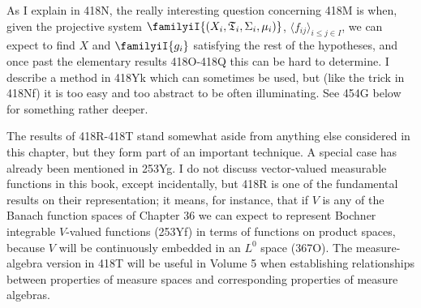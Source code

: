 {As I explain in 418N, the really interesting question concerning 418M is
when, given the projective system
$\familyiI{(X_i,\frak T_i,\Sigma_i,\mu_i)}$,
$\langle f_{ij}\rangle_{i\le j\in I}$, we can expect to find $X$ and
$\familyiI{g_i}$ satisfying the
rest of the hypotheses, and once past the elementary results 418O-418Q
this can be hard to determine.   I describe a method in 418Yk
which can sometimes be used, but (like the trick in 418Nf) it is too
easy and too abstract to be often illuminating.   See 454G below for
something rather deeper.

The results of 418R-418T stand somewhat aside from anything else
considered in this chapter, but they form part of an important
technique.   A special case has already been mentioned in 253Yg.   I do
not discuss vector-valued measurable functions in this book, except
incidentally, but 418R is one of the fundamental results on their
representation;  it means, for instance, that if $V$ is any of the
Banach function spaces of Chapter 36 we can expect to represent Bochner
integrable $V$-valued functions (253Yf) in terms of functions on product
spaces, because $V$ will be continuously embedded in an $L^0$ space
(367O).   The measure-algebra version in 418T will be useful in
Volume 5 when establishing relationships between properties of measure
spaces and corresponding properties of measure algebras.
}%

\discrpage


